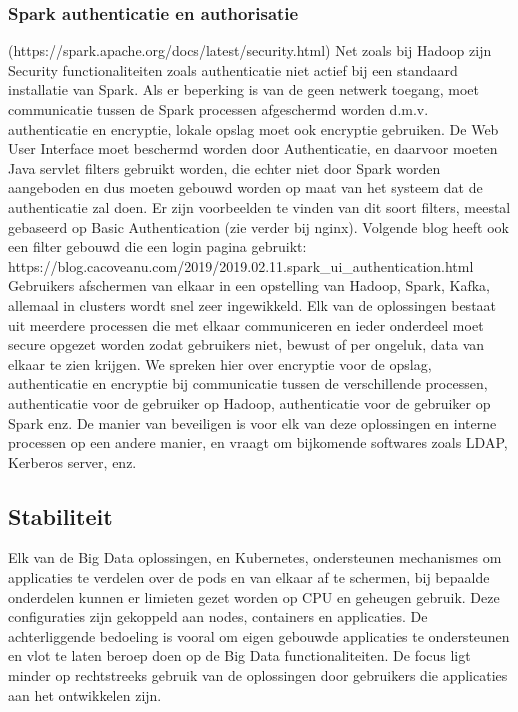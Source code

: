 \subsubsection {Spark authenticatie en authorisatie} (https://spark.apache.org/docs/latest/security.html) \newline
Net zoals bij Hadoop zijn Security functionaliteiten zoals authenticatie niet actief bij een standaard installatie van Spark. Als er beperking is van de geen netwerk toegang, moet communicatie tussen de Spark processen afgeschermd worden d.m.v. authenticatie en encryptie, lokale opslag moet ook encryptie gebruiken. De Web User Interface moet beschermd worden door Authenticatie, en daarvoor moeten Java servlet filters gebruikt worden, die echter niet door Spark worden aangeboden en dus moeten gebouwd worden op maat van het systeem dat de authenticatie zal doen.
Er zijn voorbeelden te vinden van dit soort filters, meestal gebaseerd op Basic Authentication (zie verder bij nginx). Volgende blog heeft ook een filter gebouwd die een login pagina gebruikt: \newline https://blog.cacoveanu.com/2019/2019.02.11.spark\_ui\_authentication.html
\newline
\newline
Gebruikers afschermen van elkaar in een opstelling van Hadoop, Spark, Kafka, allemaal in clusters wordt snel zeer ingewikkeld. Elk van de oplossingen bestaat uit meerdere processen die met elkaar communiceren en ieder onderdeel moet secure opgezet worden zodat gebruikers niet, bewust of per ongeluk, data van elkaar te zien krijgen. We spreken hier over encryptie voor de opslag, authenticatie en encryptie bij communicatie tussen de verschillende processen, authenticatie voor de gebruiker op Hadoop, authenticatie voor de gebruiker op Spark enz.
De manier van beveiligen is voor elk van deze oplossingen en interne processen op een andere manier, en vraagt om bijkomende softwares zoals LDAP, Kerberos server, enz.

\subsection{Stabiliteit}

Elk van de Big Data oplossingen, en Kubernetes, ondersteunen mechanismes om applicaties te verdelen over de pods en van elkaar af te schermen, bij bepaalde onderdelen kunnen er limieten gezet worden op CPU en geheugen gebruik. Deze configuraties zijn gekoppeld aan nodes, containers en applicaties. De achterliggende bedoeling is vooral om eigen gebouwde applicaties te ondersteunen en vlot te laten beroep doen op de Big Data functionaliteiten. De focus ligt minder op rechtstreeks gebruik van de oplossingen door gebruikers die applicaties aan het ontwikkelen zijn.


